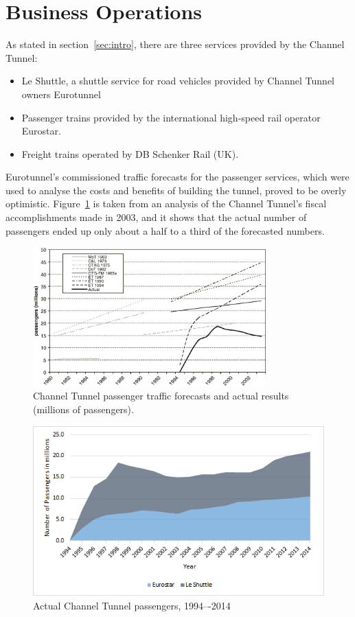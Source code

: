 \documentclass[12pt]{article} %
\begin{document}
\section{Business Operations}
\label{sec:op}

As stated in section~\ref{sec:intro}, there are three services provided by the Channel Tunnel:
\begin{itemize}
	\item Le Shuttle, a shuttle service for road vehicles provided by Channel Tunnel owners Eurotunnel
	\item Passenger trains provided by the international high-speed rail operator Eurostar.\cite{eurostar}
	\item Freight trains operated by DB Schenker Rail (UK).\cite{db-sche}
\end{itemize}

Eurotunnel's commissioned traffic forecasts for the passenger services, which were used to analyse the costs and benefits of building the tunnel, proved to be overly optimistic. Figure~\ref{fig:pass-fore} is taken from an analysis of the Channel Tunnel's fiscal accomplishments made in 2003\cite{costeval}, and it shows that the actual number of passengers ended up only about a half to a third of the forecasted numbers.

\begin{figure}[htp]
  \centering
  \includegraphics[width=0.8\textwidth]{pass}
  \caption{Channel Tunnel passenger traffic forecasts and actual results (millions of passengers).}
  \label{fig:pass-fore}
\end{figure}

\begin{figure}[htp]
  \centering
  \includegraphics[width=\textwidth]{pass-new}
  \caption{Actual Channel Tunnel passengers, 1994–-2014}
  \label{fig:pass-new}
\end{figure}
\end{document}
